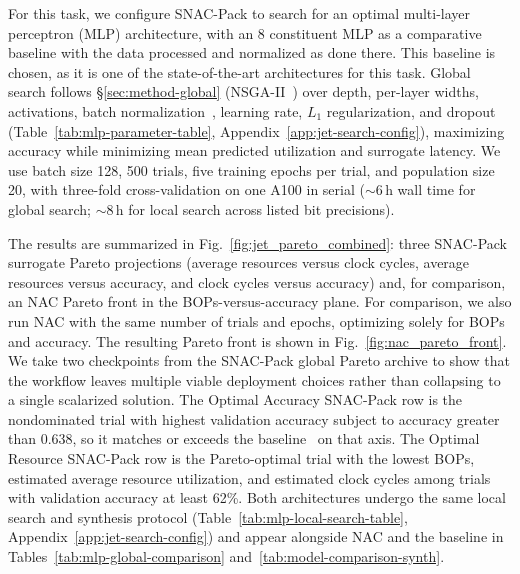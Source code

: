 \documentclass[11pt]{article}
\begin{document}
For this task, we configure SNAC-Pack to search for an optimal multi-layer perceptron (MLP) architecture, with an 8 constituent MLP as a comparative baseline \cite{Odagiu_2024} with the data processed and normalized as done there.
This baseline is chosen, as it is one of the state-of-the-art architectures for this task.
Global search follows \S\ref{sec:method-global} (NSGA-II~\cite{NSGA}) over depth, per-layer widths, activations, batch normalization~\cite{ioffe2015batch}, learning rate, $L_1$ regularization, and dropout (Table~\ref{tab:mlp-parameter-table}, Appendix~\ref{app:jet-search-config}), maximizing accuracy while minimizing mean predicted utilization and surrogate latency.
We use batch size 128, 500 trials, five training epochs per trial, and population size 20, with three-fold cross-validation on one A100 in serial ($\sim$6\,h wall time for global search; $\sim$8\,h for local search across listed bit precisions).

The results are summarized in Fig.~\ref{fig:jet_pareto_combined}: three SNAC-Pack surrogate Pareto projections (average resources versus clock cycles, average resources versus accuracy, and clock cycles versus accuracy) and, for comparison, an NAC Pareto front in the BOPs-versus-accuracy plane.
For comparison, we also run NAC with the same number of trials and epochs, optimizing solely for BOPs and accuracy.
The resulting Pareto front is shown in Fig.~\ref{fig:nac_pareto_front}.
We take two checkpoints from the SNAC-Pack global Pareto archive to show that the workflow leaves multiple viable deployment choices rather than collapsing to a single scalarized solution.
The Optimal Accuracy SNAC-Pack row is the nondominated trial with highest validation accuracy subject to accuracy greater than 0.638, so it matches or exceeds the baseline~\cite{Odagiu_2024} on that axis.
The Optimal Resource SNAC-Pack row is the Pareto-optimal trial with the lowest BOPs, estimated average resource utilization, and estimated clock cycles among trials with validation accuracy at least 62\%.
Both architectures undergo the same local search and synthesis protocol (Table~\ref{tab:mlp-local-search-table}, Appendix~\ref{app:jet-search-config}) and appear alongside NAC and the baseline in Tables~\ref{tab:mlp-global-comparison} and~\ref{tab:model-comparison-synth}.
\end{document}
